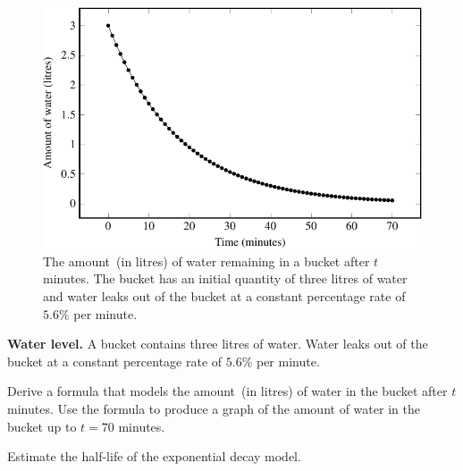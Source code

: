 \documentclass[a4paper,oneside,12pt]{article}
\begin{document}
\begin{figure}[!htbp]
\centering
\includegraphics[scale=1.1]{image/11/water.pdf}
\caption{%
  The amount~(in litres) of water remaining in a bucket after $t$
  minutes.  The bucket has an initial quantity of three litres of
  water and water leaks out of the bucket at a constant percentage
  rate of $5.6\%$ per minute.
}
\label{fig:bucket_water_level}
\end{figure}

\begin{example}
\label{eg:water_level}
\textbf{Water level.}
A bucket contains three litres of water.  Water leaks out of the
bucket at a constant percentage rate of $5.6\%$ per minute.
\begin{packedenum}
\item\label{subex:water_level_formula}
  Derive a formula that models the amount~(in litres) of water in the
  bucket after $t$ minutes.  Use the formula to produce a graph of the
  amount of water in the bucket up to $t = 70$ minutes.

\item\label{subex:water_level_half_life}
  Estimate the half-life of the exponential decay model.
\end{packedenum}
\end{example}
\end{document}
